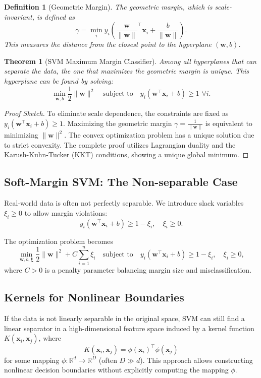 \documentclass[12pt,a4paper]{article}
\newtheorem{definition}{Definition}
\newtheorem{theorem}{Theorem}
\begin{document}
\begin{definition}[Geometric Margin]
The geometric margin, which is scale-invariant, is defined as
\[
\gamma = \min_{i} y_i\left(\frac{\mathbf{w}}{\|\mathbf{w}\|}^\top \mathbf{x}_i + \frac{b}{\|\mathbf{w}\|}\right).
\]
This measures the distance from the closest point to the hyperplane $(\mathbf{w},b)$.
\end{definition}

\begin{theorem}[SVM Maximum Margin Classifier]
Among all hyperplanes that can separate the data, the one that maximizes the geometric margin is unique. This hyperplane can be found by solving:
\[
\min_{\mathbf{w},b} \frac{1}{2}\|\mathbf{w}\|^2 \quad \text{subject to} \quad y_i(\mathbf{w}^\top \mathbf{x}_i + b) \ge 1 \,\, \forall i.
\]
\end{theorem}

\begin{proof}[Proof Sketch]
To eliminate scale dependence, the constraints are fixed as $y_i(\mathbf{w}^\top \mathbf{x}_i + b) \ge 1$. Maximizing the geometric margin $\gamma = \frac{1}{\|\mathbf{w}\|}$ is equivalent to minimizing $\|\mathbf{w}\|^2$. The convex optimization problem has a unique solution due to strict convexity. The complete proof utilizes Lagrangian duality and the Karush-Kuhn-Tucker (KKT) conditions, showing a unique global minimum.
\end{proof}

\subsection{Soft-Margin SVM: The Non-separable Case}
Real-world data is often not perfectly separable. We introduce slack variables $\xi_i \ge 0$ to allow margin violations:
\[
y_i(\mathbf{w}^\top \mathbf{x}_i + b) \ge 1 - \xi_i, \quad \xi_i \ge 0.
\]

The optimization problem becomes
\[
\min_{\mathbf{w},b,\bm{\xi}} \frac{1}{2}\|\mathbf{w}\|^2 + C\sum_{i=1}^n \xi_i \quad \text{subject to}\quad y_i(\mathbf{w}^\top \mathbf{x}_i + b) \ge 1 - \xi_i, \quad \xi_i \ge 0,
\]
where $C > 0$ is a penalty parameter balancing margin size and misclassification.

\subsection{Kernels for Nonlinear Boundaries}
If the data is not linearly separable in the original space, SVM can still find a linear separator in a high-dimensional feature space induced by a kernel function $K(\mathbf{x}_i,\mathbf{x}_j)$, where
\[
K(\mathbf{x}_i,\mathbf{x}_j) = \phi(\mathbf{x}_i)^\top \phi(\mathbf{x}_j)
\]
for some mapping $\phi: \mathbb{R}^d \to \mathbb{R}^{D}$ (often $D \gg d$). This approach allows constructing nonlinear decision boundaries without explicitly computing the mapping $\phi$.
\end{document}
